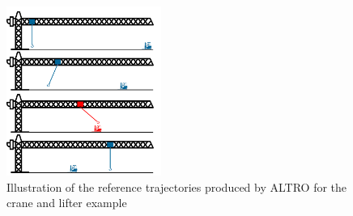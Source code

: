 \begin{figure}[t]
	\centering
	\includegraphics[width=0.45\textwidth]{figures/crane_and_lifter.png}
	\caption{Illustration of the reference trajectories produced by ALTRO for the crane and lifter example}
\end{figure}\label{fig:cr_and_lft}


